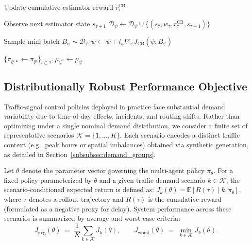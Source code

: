\documentclass[lettersize,journal]{IEEEtran}
\begin{document}
\begin{algorithm}[t!]
{{{    

    Update cumulative estimator reward $r_\tau^{\mathrm{CB}}$\;
}

        Observe next estimator state $s_{\tau+1}$\;
        $\mathcal{D}_\psi \gets \mathcal{D}_\psi \cup \{(s_\tau, w_\tau, r_\tau^{\mathrm{CB}}, s_{\tau+1})\}$\;

    }

    Sample mini-batch $B_\psi \sim \mathcal{D}_\psi$\;
    $\psi \gets \psi + l_\psi \nabla_\psi J_{\mathrm{CB}}(\psi; B_\psi)$\;
}
\Return $\{\pi_{\theta^{i}\ast} \gets \pi_{\theta^i}\}_{i\in\mathcal{I}}, \mu_{\psi^\ast} \gets \mu_\psi$\;

\end{algorithm}
\subsection{Distributionally Robust Performance Objective}
\label{subsec:robust-objective}

Traffic-signal control policies deployed in practice face substantial demand variability due to time-of-day effects, incidents, and routing shifts. Rather than optimizing under a single nominal demand distribution, we consider a finite set of representative scenarios \( \mathcal{K}=\{1,\dots,K\} \). Each scenario encodes a distinct traffic context (e.g., peak hours or spatial imbalances) obtained via synthetic generation, as detailed in Section~\ref{subsubsec:demand_groups}.

Let $\theta$ denote the parameter vector governing the multi-agent policy $\pi_\theta$. For a fixed policy parameterized by $\theta$ and a given traffic demand scenario $k \in \mathcal{K}$, the scenario-conditioned expected return is defined as:
\(
    J_k(\theta) = \mathbb{E}[R(\tau) \mid k, \pi_\theta]
    \label{eq:expected_return}
\),
where $\tau$ denotes a rollout trajectory and $R(\tau)$ is the cumulative reward (formulated as a negative proxy for delay). System performance across these scenarios is summarized by average and worst-case criteria:
\begin{equation}
J_{\mathrm{avg}}(\theta)
\;=\;
\frac{1}{K}\sum_{k\in\mathcal{K}} J_k(\theta),
\qquad
J_{\mathrm{worst}}(\theta)
\;=\;
\min_{k\in\mathcal{K}} J_k(\theta).
\label{eq:j-avg-worst}
\end{equation}
\end{document}
